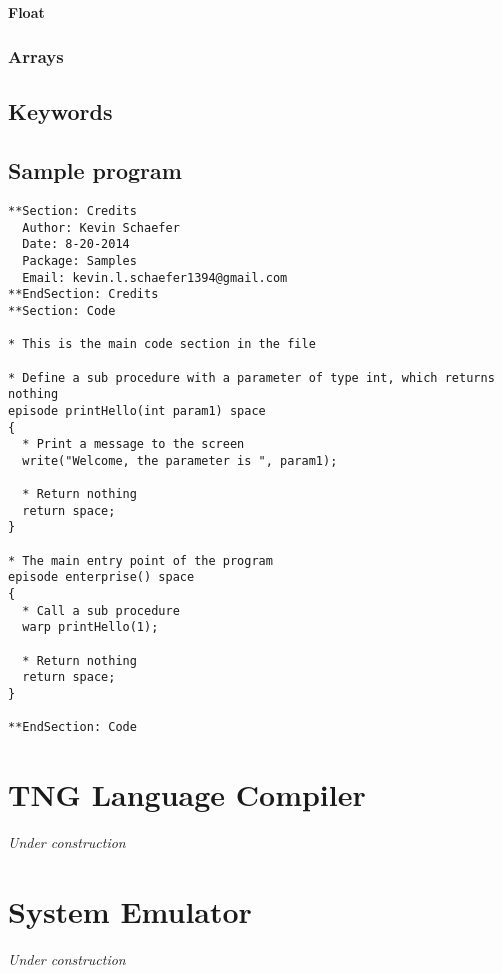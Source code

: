 \documentclass{book}
\begin{document}
\subsubsection{Float}
\subsection{Arrays}

\section{Keywords}

\section{Sample program}
\begin{lstlisting}
**Section: Credits
  Author: Kevin Schaefer
  Date: 8-20-2014
  Package: Samples
  Email: kevin.l.schaefer1394@gmail.com
**EndSection: Credits
**Section: Code

* This is the main code section in the file

* Define a sub procedure with a parameter of type int, which returns nothing
episode printHello(int param1) space
{
  * Print a message to the screen
  write("Welcome, the parameter is ", param1);

  * Return nothing
  return space;
}

* The main entry point of the program
episode enterprise() space
{
  * Call a sub procedure
  warp printHello(1);

  * Return nothing
  return space;
}

**EndSection: Code
\end{lstlisting}

\chapter{TNG Language Compiler}
\textit{Under construction}

\chapter{System Emulator}
\textit{Under construction}
\end{document}
